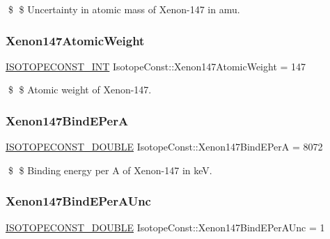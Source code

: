 \$ \$ Uncertainty in atomic mass of Xenon-\/147 in amu. \mbox{\label{group___isotope_const-_xenon-_xe147_ga61a449ca5933362c6cceae5045a863a5}} 
\subsubsection{\texorpdfstring{Xenon147\+Atomic\+Weight}{Xenon147AtomicWeight}}
{\footnotesize\ttfamily \mbox{\hyperlink{group___isotope_const-_macros_ga5f18360b3e99483a35c32d789e62621c}{I\+S\+O\+T\+O\+P\+E\+C\+O\+N\+S\+T\+\_\+\+I\+NT}} Isotope\+Const\+::\+Xenon147\+Atomic\+Weight = 147}

\$ \$ Atomic weight of Xenon-\/147. \mbox{\label{group___isotope_const-_xenon-_xe147_gaac54bed45adaab29ce676cdcb024c10b}} 
\subsubsection{\texorpdfstring{Xenon147\+Bind\+E\+PerA}{Xenon147BindEPerA}}
{\footnotesize\ttfamily \mbox{\hyperlink{group___isotope_const-_macros_ga8f45a7272ce02c0b4c65c44636ed719a}{I\+S\+O\+T\+O\+P\+E\+C\+O\+N\+S\+T\+\_\+\+D\+O\+U\+B\+LE}} Isotope\+Const\+::\+Xenon147\+Bind\+E\+PerA = 8072}

\$ \$ Binding energy per A of Xenon-\/147 in keV. \mbox{\label{group___isotope_const-_xenon-_xe147_ga9951bdfbca347b64f1ca072dada435bd}} 
\subsubsection{\texorpdfstring{Xenon147\+Bind\+E\+Per\+A\+Unc}{Xenon147BindEPerAUnc}}
{\footnotesize\ttfamily \mbox{\hyperlink{group___isotope_const-_macros_ga8f45a7272ce02c0b4c65c44636ed719a}{I\+S\+O\+T\+O\+P\+E\+C\+O\+N\+S\+T\+\_\+\+D\+O\+U\+B\+LE}} Isotope\+Const\+::\+Xenon147\+Bind\+E\+Per\+A\+Unc = 1}

